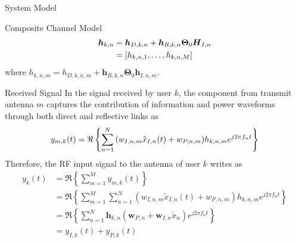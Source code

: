 \documentclass{IEEEtran}
\begin{document}
\begin{section} {System Model}
\begin{subsection}	{Composite Channel Model}
		\begin{equation}	\label{eq:h_{k,n}}
			\begin{split}
				\boldsymbol{h}_{k,n}
				&=\boldsymbol{h}_{D,k,n}+\boldsymbol{h}_{R,k,n}\boldsymbol{\Theta}_0\boldsymbol{H}_{I,n}	\\
				&=[h_{k,n,1},\dots,h_{k,n,M}]
			\end{split}
		\end{equation}
		where $h_{k,n,m}=h_{D,k,n,m}+\boldsymbol{h}_{R,k,n}\boldsymbol{\Theta}_0\boldsymbol{h}_{I,n,m}$.
	\end{subsection}

	\begin{subsection}	{Received Signal}
		In the signal received by user $k$, the component from transmit antenna $m$ captures the contribution of information and power waveforms through both direct and reflective links as
		\begin{equation}	\label{eq:y_{m,k}(t)}
			y_{m,k}(t)=\Re\left\{\sum_{n=1}^N{(w_{I,n,m}\tilde{x}_{I,n}(t)+w_{P,n,m})h_{k,n,m}e^{j2{\pi}{f_n}t}}\right\}
		\end{equation}
		Therefore, the RF input signal to the antenna of user $k$ writes as
		\begin{equation}	\label{eq:y_k(t)}
			\begin{split}
				y_k(t)
				&=\Re\left\{\sum_{m=1}^M{y_{m,k}(t)}\right\}	\\
				&=\Re\left\{\sum_{m=1}^M{\sum_{n=1}^N{(w_{I,n,m}\tilde{x}_{I,n}(t)+w_{P,n,m})h_{k,n,m}e^{j2{\pi}{f_n}t}}}\right\}	\\
				&=\Re\left\{\sum_{n=1}^N{\boldsymbol{h}_{k,n}(\boldsymbol{w}_{P,n}+\boldsymbol{w}_{I,n}\tilde{x}_n)e^{j2{\pi}{f_n}t}}\right\}	\\
				&=y_{I,k}(t)+y_{P,k}(t)
			\end{split}
		\end{equation}

\end{subsection}
\end{section}
\end{document}
